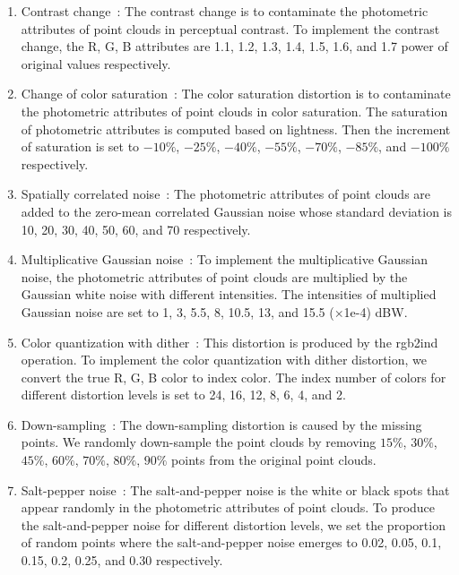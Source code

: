 \documentclass[acmsmall]{acmart}
\begin{document}
\begin{enumerate}
  \item {\sf Contrast change~\cite{Ponomarenko2015TID2013}}: The contrast change is to contaminate the photometric attributes of point clouds in perceptual contrast. To implement the contrast change, the R, G, B attributes are 1.1, 1.2, 1.3, 1.4, 1.5, 1.6, and 1.7 power of original values respectively.
  \item {\sf Change of color saturation~\cite{Ponomarenko2015TID2013}}:  The color saturation distortion is to contaminate the photometric attributes of point clouds in color saturation. The saturation of photometric attributes is computed based on lightness. Then the increment of saturation is set to $-10\%$, $-25\%$, $-40\%$, $-55\%$, $-70\%$, $-85\%$, and $-100\%$ respectively.
  \item {\sf Spatially correlated noise~\cite{Ponomarenko2015TID2013}}: The photometric attributes of point clouds are added to the zero-mean correlated Gaussian noise whose standard deviation is 10, 20, 30, 40, 50, 60, and 70 respectively.
  \item {\sf Multiplicative Gaussian noise~\cite{Ponomarenko2015TID2013}}: To implement the multiplicative Gaussian noise, the photometric attributes of point clouds are multiplied by the Gaussian white noise with different intensities. The intensities of multiplied Gaussian noise are set to 1, 3, 5.5, 8, 10.5, 13, and 15.5 ($\times$1e-4) dBW.
  \item {\sf Color quantization with dither~\cite{Boyat2015ImageNoise,Ponomarenko2015TID2013}}: This distortion is produced by the rgb2ind operation. To implement the color quantization with dither distortion, we convert the true R, G, B color to index color. The index number of colors for different distortion levels is set to 24, 16, 12, 8, 6, 4, and 2.
  \item {\sf Down-sampling~\cite{Ponomarenko2015TID2013,Yang2020TMM3DTO2D}}: The down-sampling distortion is caused by the missing points. We randomly down-sample the point clouds by removing $15\%$, $30\%$, $45\%$, $60\%$, $70\%$, $80\%$, $90\%$ points from the original point clouds.
  \item {\sf Salt-pepper noise~\cite{Boyat2015ImageNoise,Ponomarenko2015TID2013}}: The salt-and-pepper noise is the white or black spots that appear randomly in the photometric attributes of point clouds. To produce the salt-and-pepper noise for different distortion levels, we set the proportion of random points where the salt-and-pepper noise emerges to 0.02, 0.05, 0.1, 0.15, 0.2, 0.25, and 0.30 respectively.

\end{enumerate}
\end{document}
